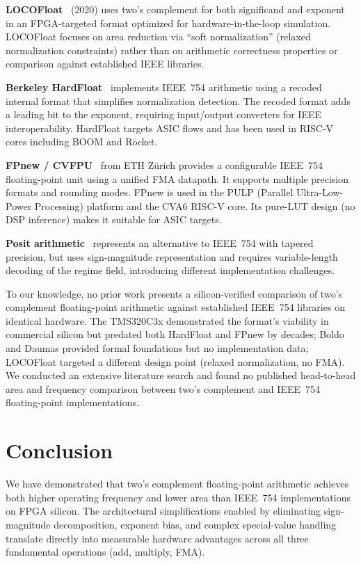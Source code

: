 \documentclass[10pt,twocolumn]{article}
\begin{document}
\textbf{LOCOFloat}~\cite{locofloat} (2020) uses two's complement for
both significand and exponent in an FPGA-targeted format optimized for
hardware-in-the-loop simulation.  LOCOFloat focuses on area reduction
via ``soft normalization'' (relaxed normalization constraints) rather
than on arithmetic correctness properties or comparison against
established IEEE libraries.

\textbf{Berkeley HardFloat}~\cite{hardFloat} implements IEEE~754
arithmetic using a recoded internal format that simplifies normalization
detection.  The recoded format adds a leading bit to the exponent,
requiring input/output converters for IEEE interoperability.  HardFloat
targets ASIC flows and has been used in RISC-V cores including BOOM
and Rocket.

\textbf{FPnew / CVFPU}~\cite{fpnew} from ETH Z\"urich provides a
configurable IEEE~754 floating-point unit using a unified FMA datapath.
It supports multiple precision formats and rounding modes.  FPnew is
used in the PULP (Parallel Ultra-Low-Power Processing) platform and
the CVA6 RISC-V core.  Its pure-LUT design (no DSP inference) makes
it suitable for ASIC targets.

\textbf{Posit arithmetic}~\cite{posit} represents an alternative to
IEEE~754 with tapered precision, but uses sign-magnitude representation
and requires variable-length decoding of the regime field, introducing
different implementation challenges.

To our knowledge, no prior work presents a silicon-verified comparison
of two's complement floating-point arithmetic against established IEEE~754
libraries on identical hardware.  The TMS320C3x demonstrated the format's
viability in commercial silicon but predated both HardFloat and FPnew
by decades; Boldo and Daumas provided formal foundations but no
implementation data; LOCOFloat targeted a different design point
(relaxed normalization, no FMA).  We conducted an extensive literature
search and found no published head-to-head area and frequency comparison
between two's complement and IEEE~754 floating-point implementations.

\section{Conclusion}
\label{sec:conclusion}

We have demonstrated that two's complement floating-point arithmetic
achieves both higher operating frequency and lower area than IEEE~754
implementations on FPGA silicon.  The architectural simplifications
enabled by eliminating sign-magnitude decomposition, exponent bias,
and complex special-value handling translate directly into measurable
hardware advantages across all three fundamental operations (add,
multiply, FMA).
\end{document}
